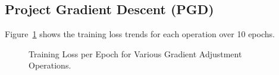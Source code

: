 \documentclass[11pt]{article}
\begin{document}
    \begin{table}[!htbp]
        \centering
        \caption{Examples of model outputs from GA strategy 3}
        \label{tab:ga_result_examples}
    \end{table}

    \subsection{Project Gradient Descent (PGD)}
    Figure~\ref{fig:training-loss} shows the training loss trends for each operation over 10 epochs.
    \begin{figure}[h!]
        \centering
        \caption{Training Loss per Epoch for Various Gradient Adjustment Operations.}
        \label{fig:training-loss}
    \end{figure}
\end{document}
